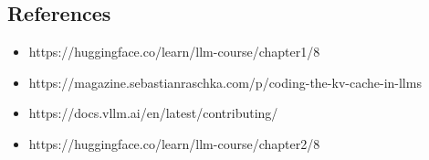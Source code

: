 \documentclass{article}
\begin{document}
\subsection{References}\label{references}

\begin{itemize}
\item
  https://huggingface.co/learn/llm-course/chapter1/8
\item
  https://magazine.sebastianraschka.com/p/coding-the-kv-cache-in-llms
\item
  https://docs.vllm.ai/en/latest/contributing/
\item
  https://huggingface.co/learn/llm-course/chapter2/8
\end{itemize}
\end{document}
